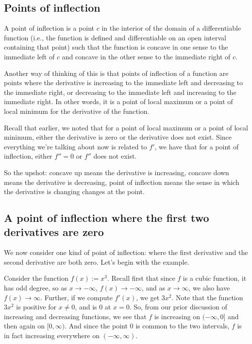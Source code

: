 \documentclass[10pt]{amsart}
\begin{document}
\subsection{Points of inflection}

A point of inflection is a point $c$ in the interior of the domain of
a differentiable function (i.e., the function is defined and
differentiable on an open interval containing that point) such that
the function is concave in one sense to the immediate left of $c$ and
concave in the other sense to the immediate right of $c$.

Another way of thinking of this is that points of inflection of a
function are points where the derivative is increasing to the
immediate left and decreasing to the immediate right, or decreasing to
the immediate left and increasing to the immediate right. In other
words, it is a point of local maximum or a point of local minimum for
the derivative of the function.

Recall that earlier, we noted that for a point of local maximum or a
point of local minimum, either the derivative is zero or the
derivative does not exist. Since everything we're talking about now is
related to $f'$, we have that for a point of inflection, either $f'' =
0$ or $f''$ does not exist.

So the upshot: concave up means the derivative is increasing, concave
down means the derivative is decreasing, point of inflection means the
sense in which the derivative is changing changes at the point.

\subsection{A point of inflection where the first two derivatives are zero}

We now consider one kind of point of inflection: where the first
derivative and the second derivative are both zero. Let's begin with
the example.

Consider the function $f(x):= x^3$. Recall first that since $f$ is a
cubic function, it has odd degree, so as $x \to -\infty$, $f(x) \to
-\infty$, and as $x \to \infty$, we also have $f(x) \to
\infty$. Further, if we compute $f'(x)$, we get $3x^2$. Note that the
function $3x^2$ is positive for $x \ne 0$, and is $0$ at $x = 0$. So,
from our prior discussion of increasing and decreasing functions, we
see that $f$ is increasing on $(-\infty,0]$ and then again on
$[0,\infty)$. And since the point $0$ is common to the two intervals,
$f$ is in fact increasing everywhere on $(-\infty,\infty)$.
\end{document}
